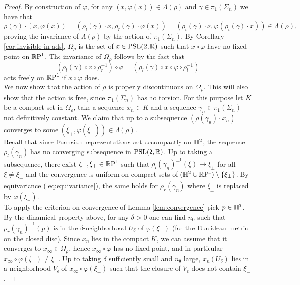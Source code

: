 \begin{proof}
    By construction of $\varphi$, for any $(x, \varphi(x)) \in \Lambda(\rho)$ and $\gamma \in \pi_1(\Sigma_n)$ we have that 
    \[
        \rho(\gamma) \cdot(x,\varphi(x)) = (\rho_l(\gamma) \cdot x, \rho_r(\gamma) \cdot \varphi(x)) = (\rho_l(\gamma) \cdot x,  \varphi(\rho_l(\gamma)\cdot x)) \in \Lambda(\rho), 
    \]
    proving the invariance of $\Lambda(\rho)$ by the action of $\pi_1(\Sigma_n)$. By Corollary \ref{cor:invisible in ads}, $\Omega_\rho$ is the set of $x \in \PSL$ such that $x\circ \varphi$ have no fixed point on $\S$. The invariance of $\Omega_\rho$ follows by the fact that
    \[
        (\rho_l(\gamma) \circ x \circ \rho_r^{-1} ) \circ \varphi = (\rho_l(\gamma) \circ x \circ \varphi \circ \rho_l^{-1})
    \]
    acts freely on $\S$ if $x \circ \varphi$  does.\\
    We now show that the action of $\rho$ is properly discontinuous on $\Omega_\rho$. This will also show that the action is free, since $\pi_1(\Sigma_n)$ has no torsion.
    For this purpose let $K$ be a compact set in $\Omega_\rho$, take a sequence $x_n \in K$ and a sequence $\gamma_n \in \pi_1(\Sigma_n)$ not definitively constant. We claim that up to a subsequence $(\rho(\gamma_n)\cdot x_n)$ converges to some $(\xi_+, \varphi(\xi_+)) \in \Lambda(\rho)$.\\
    Recall that since Fuchsian representations act cocompactly on $\H^2$, the sequence $\rho_l(\gamma_n)$ has no converging subsequence in $\PSL$. Up to taking a subsequence, there exist $\xi_-,\xi_+ \in \S$ such that $\rho_l(\gamma_n)^{\pm 1}(\xi) \to \xi_\pm$ for all $\xi \neq \xi_\mp$ and the convergence is uniform on compact sets of $(\H^2 \cup \S) \setminus \{\xi_\pm \}$. By equivariance (\ref{eq:equivariance}), the same holds for $\rho_r(\gamma_n)$ where $\xi_\pm$ is replaced by $\varphi (\xi_\pm)$.\\
    To apply the criterion on convergence of Lemma \ref{lem:convergence} pick $p\in \H^2$. By the dinamical property above, for any $\delta >0$ one can find $n_0$ such that $\rho_r(\gamma_n)^{-1}(p)$ is in the $\delta$-neighborhood $U_\delta$ of $\varphi(\xi_-)$ (for the Euclidean metric on the closed disc).
    Since $x_n$ lies in the compact $K$, we can assume that it converges to $x_\infty \in \Omega_\rho$, hence $x_\infty \circ \varphi$ has no fixed point, and in particular $x_\infty \circ \varphi(\xi_-) \neq \xi_-$.
    Up to taking $\delta$ sufficiently small and $n_0$ large, $x_n(U_\delta)$ lies in a neighborhood $V_\epsilon$ of $x_\infty \circ \varphi(\xi_-)$ such that the closure of $V_\epsilon$ does not contain $\xi_-$.

\end{proof}
